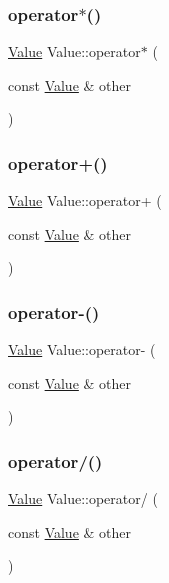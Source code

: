 \mbox{\label{classValue_a8c1b2b5806fbf5d37d0b8bb2ec1ac584}} 
\subsubsection{\texorpdfstring{operator$\ast$()}{operator*()}}
{\footnotesize\ttfamily \hyperlink{classValue}{Value} Value\+::operator$\ast$ (\begin{DoxyParamCaption}\item[{const \hyperlink{classValue}{Value} \&}]{other }\end{DoxyParamCaption})}

\mbox{\label{classValue_a59e467d3ee4cdfb802a2aed8a5a0f1dd}} 
\subsubsection{\texorpdfstring{operator+()}{operator+()}}
{\footnotesize\ttfamily \hyperlink{classValue}{Value} Value\+::operator+ (\begin{DoxyParamCaption}\item[{const \hyperlink{classValue}{Value} \&}]{other }\end{DoxyParamCaption})}

\mbox{\label{classValue_aeb5e368aaea65ed1d1ef37fef6de80fc}} 
\subsubsection{\texorpdfstring{operator-\/()}{operator-()}}
{\footnotesize\ttfamily \hyperlink{classValue}{Value} Value\+::operator-\/ (\begin{DoxyParamCaption}\item[{const \hyperlink{classValue}{Value} \&}]{other }\end{DoxyParamCaption})}

\mbox{\label{classValue_a5bee3270435124beed9a24cb78941a56}} 
\subsubsection{\texorpdfstring{operator/()}{operator/()}}
{\footnotesize\ttfamily \hyperlink{classValue}{Value} Value\+::operator/ (\begin{DoxyParamCaption}\item[{const \hyperlink{classValue}{Value} \&}]{other }\end{DoxyParamCaption})}

